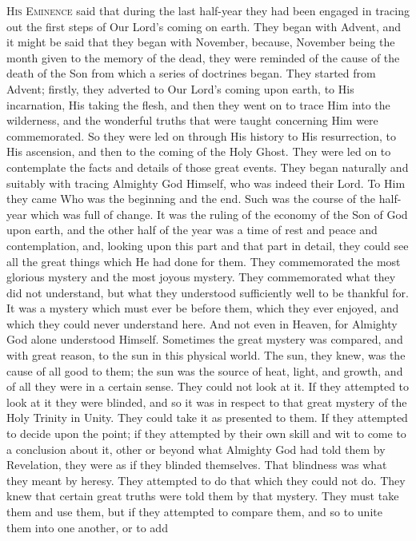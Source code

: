 H\textsc{is} E\textsc{minence}
said that during the last half-year they had been engaged in tracing
out the first steps of Our Lord's coming on earth. They began with
Advent, and it might be said that they began with November, because,
November being the month given to the memory of the dead, they were
reminded of the cause of the death of the Son from which a series of
doctrines began. They started from Advent; firstly, they adverted to
Our Lord's coming upon earth, to His incarnation, His taking the
flesh, and then they went on to trace Him into the wilderness, and the
wonderful truths that were taught concerning Him were commemorated. So
they were led on through His history to His resurrection, to His
ascension, and then to the coming of the Holy Ghost. They were led on
to contemplate the facts and details of those great events. They began
naturally and suitably with tracing Almighty God Himself, who was
indeed their Lord. To Him they came Who was the beginning and the end.
Such was the course of the half-year which was full of change. It was
the ruling of the economy of the Son of God upon earth, and the other
half of the year was a time of rest and peace and contemplation, and,
looking upon this part and that part in detail, they could see all the
great things which He had done for them. They commemorated the most
glorious mystery and the most joyous mystery. They commemorated what
they did not understand, but what they understood sufficiently well to
be thankful for. It was a mystery which must ever be before them,
which they ever enjoyed, and which they could never understand here.
And not even in Heaven, for Almighty God alone understood Himself.
Sometimes the great mystery was compared, and with great reason, to
the sun in this physical world. The sun, they knew, was the cause of
all good to them; the sun was the source of heat, light, and growth,
and of all they were in a certain sense. They could not look at it. If
they attempted to look at it they were blinded, and so it was in
respect to that great mystery of the Holy Trinity in Unity. They could
take it as presented to them. If they attempted to decide upon the
point; if they attempted by their own skill and wit to come to a
conclusion about it, other or beyond what Almighty God had told them
by Revelation, they were as if they blinded themselves. That blindness
was what they meant by heresy. They attempted to do that which they
could not do. They knew that certain great truths were told them by
that mystery. They must take them and use them, but if they attempted
to compare them, and so to unite them into one another, or to add
